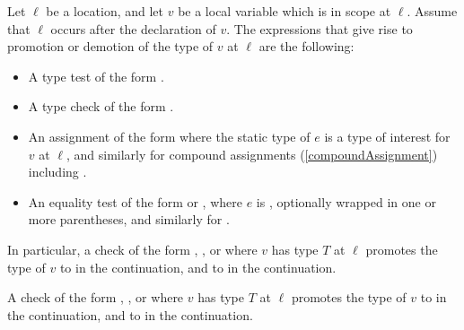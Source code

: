 \documentclass[makeidx]{article}
\begin{document}
\LMHash{}%
Let $\ell$ be a location,
and let $v$ be a local variable which is in scope at $\ell$.
Assume that $\ell$ occurs after the declaration of $v$.
The expressions that give rise to promotion or demotion
of the type of $v$ at $\ell$
are the following:

\begin{itemize}
\item A type test of the form .
\item A type check of the form .
\item An assignment of the form 
  where the static type of $e$ is a type of interest for $v$ at $\ell$,
  and similarly for compound assignments
  (\ref{compoundAssignment})
  including .
\item An equality test of the form  or
  , where $e$ is \NULL,
  optionally wrapped in one or more parentheses,
  and similarly for \lit{!=}.
\end{itemize}

\LMHash{}%
In particular,
a check of the form ,
,
or 
where $v$ has type $T$ at $\ell$
promotes the type of $v$
to  in the \TRUE{} continuation,
and to  in the \FALSE{} continuation.

\LMHash{}%
A check of the form ,
,
or 
where $v$ has type $T$ at $\ell$
promotes the type of $v$
to  in the \TRUE{} continuation,
and to  in the \FALSE{} continuation.

\end{document}
